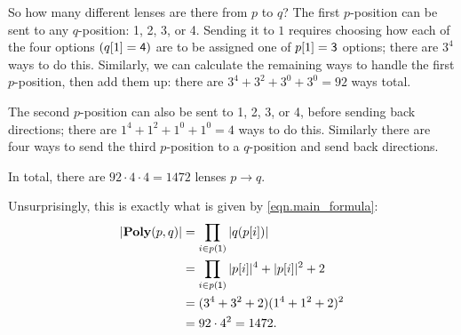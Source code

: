 \documentclass[Book-Poly]{subfiles}
\begin{document}
\begin{example}
So how many different lenses are there from $p$ to $q$? The first $p$-position can be sent to any $q$-position: 1, 2, 3, or 4. Sending it to $1$ requires choosing how each of the four options $(q[1]=\textsf{4})$ are to be assigned one of $p[1]=\textsf{3}$ options; there are $3^4$ ways to do this. Similarly, we can calculate the remaining ways to handle the first $p$-position, then add them up: there are $3^4+3^2+3^0+3^0=92$ ways total.

The second $p$-position can also be sent to 1, 2, 3, or 4, before sending back directions; there are $1^4+1^2+1^0+1^0=4$ ways to do this.
Similarly there are four ways to send the third $p$-position to a $q$-position and send back directions.

In total, there are $92 \cdot 4 \cdot 4=1472$ lenses $p\to q$.

Unsurprisingly, this is exactly what is given by \eqref{eqn.main_formula}:
\begin{align*}
    |\mathbf{Poly}(p, q)| &= \prod_{i \in p(\textsf{1})} |q(p[i])| \\
    &= \prod_{i \in p(\textsf{1})} |p[i]|^4 + |p[i]|^2 + 2 \\
    &= (3^4 + 3^2 + 2)(1^4 + 1^2 + 2)^2 \\
    &= 92 \cdot 4^2 = 1472.
\end{align*}
\end{example}
\end{document}
